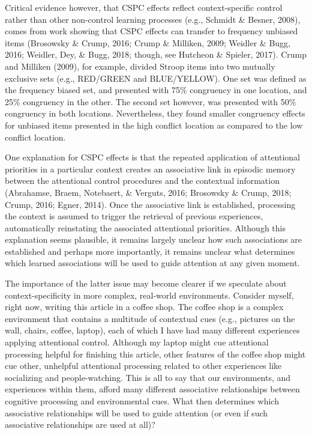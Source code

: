 \documentclass[english,,man,floatsintext]{apa6}
\begin{document}
Critical evidence however, that CSPC effects reflect context-specific control rather than other non-control learning processes (e.g., Schmidt \& Besner, 2008), comes from work showing that CSPC effects can transfer to frequency unbiased items (Brosowsky \& Crump, 2016; Crump \& Milliken, 2009; Weidler \& Bugg, 2016; Weidler, Dey, \& Bugg, 2018; though, see Hutcheon \& Spieler, 2017). Crump and Milliken (2009), for example, divided Stroop items into two mutually exclusive sets (e.g., RED/GREEN and BLUE/YELLOW). One set was defined as the frequency biased set, and presented with 75\% congruency in one location, and 25\% congruency in the other. The second set however, was presented with 50\% congruency in both locations. Nevertheless, they found smaller congruency effects for unbiased items presented in the high conflict location as compared to the low conflict location.

One explanation for CSPC effects is that the repeated application of attentional priorities in a particular context creates an associative link in episodic memory between the attentional control procedures and the contextual information (Abrahamse, Braem, Notebaert, \& Verguts, 2016; Brosowsky \& Crump, 2018; Crump, 2016; Egner, 2014). Once the associative link is established, processing the context is assumed to trigger the retrieval of previous experiences, automatically reinstating the associated attentional priorities. Although this explanation seems plausible, it remains largely unclear how such associations are established and perhaps more importantly, it remains unclear what determines which learned associations will be used to guide attention at any given moment.

The importance of the latter issue may become clearer if we speculate about context-specificity in more complex, real-world environments. Consider myself, right now, writing this article in a coffee shop. The coffee shop is a complex environment that contains a multitude of contextual cues (e.g., pictures on the wall, chairs, coffee, laptop), each of which I have had many different experiences applying attentional control. Although my laptop might cue attentional processing helpful for finishing this article, other features of the coffee shop might cue other, unhelpful attentional processing related to other experiences like socializing and people-watching. This is all to say that our environments, and experiences within them, afford many different associative relationships between cognitive processing and environmental cues. What then determines which associative relationships will be used to guide attention (or even if such associative relationships are used at all)?
\end{document}
